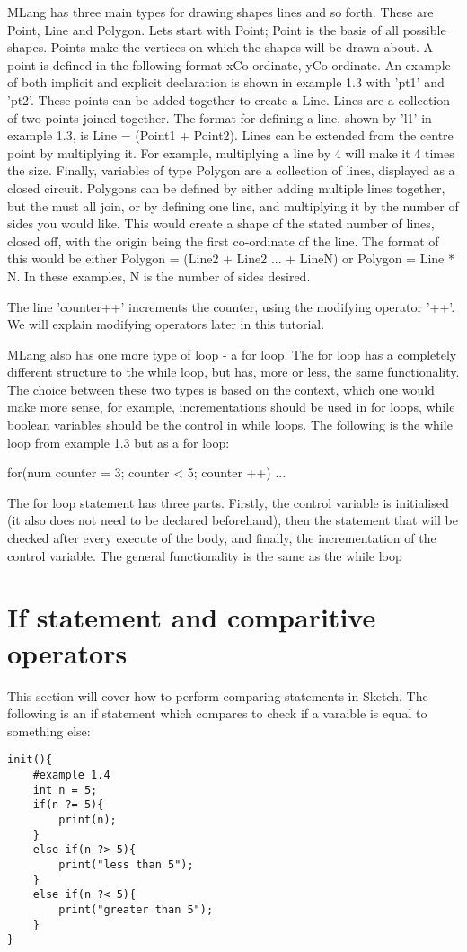 \documentclass{l3proj}
\begin{document}
MLang has three main types for drawing shapes lines and so forth. These are Point, Line and Polygon. Lets start with Point; Point is the basis of all possible shapes. Points make the vertices on which the shapes will be drawn about. A point is defined in the following format {xCo-ordinate, yCo-ordinate}. An example of both implicit and explicit declaration is shown in example 1.3 with 'pt1' and 'pt2'. These points can be added together to create a Line. Lines are a collection of two points joined together. The format for defining a line, shown by 'l1' in example 1.3, is Line = (Point1 + Point2). Lines can be extended from the centre point by multiplying it. For example, multiplying a line by 4 will make it 4 times the size. Finally, variables of type Polygon are a collection of lines, displayed as a closed circuit. Polygons can be defined by either adding multiple lines together, but the must all join, or by defining one line, and multiplying it by the number of sides you would like. This would create a shape of the stated number of lines, closed off, with the origin being the first co-ordinate of the line. The format of this would be either Polygon = (Line2 + Line2 ... + LineN) or Polygon = Line * N. In these examples, N is the number of sides desired.

The line 'counter++' increments the counter, using the modifying operator '++'. We will explain modifying operators later in this tutorial.

MLang also has one more type of loop - a for loop. The for loop has a completely different structure to the while loop, but has, more or less, the same functionality. The choice between these two types is based on the context, which one would make more sense, for example, incrementations should be used in for loops, while boolean variables should be the control in while loops. The following is the while loop from example 1.3 but as a for loop:
\begin{lstListing}
for(num counter = 3; counter < 5; counter ++){
...
}
\end{lstListing}
The for loop statement has three parts. Firstly, the control variable is initialised (it also does not need to be declared beforehand), then the statement that will be checked after every execute of the body, and finally, the incrementation of the control variable. The general functionality is the same as the while loop

\section{If statement and comparitive operators}
\label{comp}
This section will cover how to perform comparing statements in Sketch. The following is an if statement which compares to check if a varaible is equal to something else:
\begin{lstlisting}
init(){
	#example 1.4
	int n = 5;
	if(n ?= 5){
		print(n);
	}
	else if(n ?> 5){
		print("less than 5");
	}
	else if(n ?< 5){
		print("greater than 5");
	} 
}
\end{lstlisting}
\end{document}
